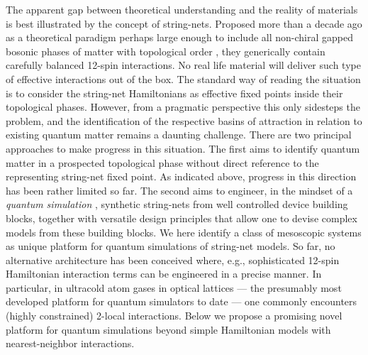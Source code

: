 \documentclass[twocolumn,floats,prx,showpacs]{revtex4-1}
\newcommand{\rein}[1]{{\color{rein} #1}}
\begin{document}
The apparent gap between theoretical understanding and the reality of materials is best illustrated by the concept of string-nets. Proposed more than a decade ago as a theoretical paradigm perhaps large enough to include all \rein{non-chiral gapped bosonic phases of matter with topological  order} \cite{Levin2005,LevinWen,Wen2017}, they generically contain carefully balanced 12-spin interactions. No real life material will deliver such type of effective interactions out of the box. The standard way of reading the situation is to consider the string-net Hamiltonians as effective fixed points inside their topological phases. However, from a pragmatic perspective this only sidesteps the problem, and the identification of the respective basins of attraction in relation to existing quantum matter remains a daunting challenge. 
There are two principal approaches to make progress in this situation. The first aims to identify quantum matter in a prospected topological phase without direct reference to the representing string-net fixed point. As indicated above, progress in this direction has been rather limited so far.
The second aims to engineer, \rein{in the mindset of
a \emph{quantum simulation}  \cite{CiracZollerSimulation,Roadmap},  synthetic string-nets from well controlled device building blocks, 
together with versatile design principles that allow one to devise complex models from these building blocks. 
We here identify a class of mesoscopic systems as unique platform for quantum simulations of string-net models. 
So far, no alternative architecture has been conceived where, e.g., sophisticated 12-spin Hamiltonian interaction terms can be engineered in a precise manner. 
In particular, in ultracold atom gases in optical lattices
\cite{BlochSimulation} --- the presumably most developed platform for quantum simulators to date ---
one commonly encounters (highly constrained) 2-local interactions.
Below we propose a promising novel platform for quantum simulations beyond simple Hamiltonian models with nearest-neighbor interactions.}
\end{document}
